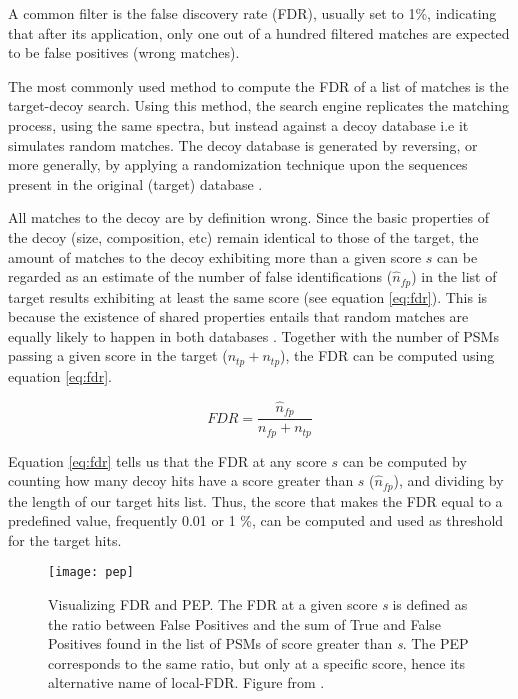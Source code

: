 A common filter is the false discovery rate (FDR), usually set to 1\%, indicating that after its application, only one out of a hundred filtered matches are expected to be false positives (wrong matches).

The most commonly used method to compute the \ac{FDR} of a list of matches is the target-decoy search. Using this method, the search engine replicates the matching process, using the same spectra, but instead against a decoy database i.e it simulates random matches. The decoy database is generated by reversing, or more generally, by applying a randomization technique upon the sequences present in the original (target) database \cite{Elias2010}. 

All matches to the decoy are by definition wrong. Since the basic properties of the decoy (size, composition, etc) remain identical to those of the target, the amount of matches to the decoy exhibiting more than a given score $s$ can be regarded as an estimate of the number of false identifications ($\hat{n}_{fp}$) in the list of target results exhibiting at least the same score (see equation \ref{eq:fdr}). This is because the existence of shared properties entails that random matches are equally likely to happen in both databases \cite{Elias2010}. Together with the number of PSMs passing a given score in the target ($n_{tp} + n_{tp}$), the FDR can be computed using equation \ref{eq:fdr}.

\begin{equation}\label{eq:fdr}
FDR = \frac{\hat{n}_{fp}}{n_{fp} + n_{tp}}
\end{equation}

Equation \ref{eq:fdr} tells us that the FDR at any score $s$ can be computed by counting how many decoy hits have a score greater than $s$ ($\hat{n}_{fp}$), and dividing by the length of our target hits list. Thus, the score that makes the FDR equal to a predefined value, frequently 0.01 or 1 \%, can be computed and used as threshold for the target hits.

\begin{figure}[!h]
\centering
\texttt{[image: pep]}
\caption[FDR and PEP]{Visualizing FDR and PEP. The FDR at a given score \textit{s} is defined as the ratio between False Positives and the sum of True and False Positives found in the list of PSMs of score greater than \textit{s}. The PEP corresponds to the same ratio, but only at a specific score, hence its alternative name of local-FDR. Figure from \cite{Kall2008}.}
\label{fig:pep}
\end{figure}


